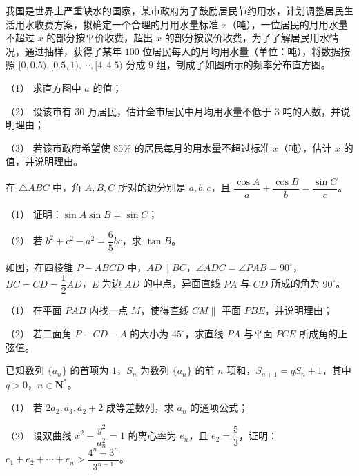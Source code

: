 \Needspace{0.4\textheight}
\begin{question}
我国是世界上严重缺水的国家，某市政府为了鼓励居民节约用水，计划调整居民生活用水收费方案，拟确定一个合理的月用水量标准 \(x\)（吨），一位居民的月用水量不超过 \(x\) 的部分按平价收费，超出 \(x\) 的部分按议价收费，为了了解居民用水情况，通过抽样，获得了某年 \(100\) 位居民每人的月均用水量（单位：吨），将数据按照 \([0,0.5),[0.5,1),\cdots,[4,4.5)\) 分成 \(9\) 组，制成了如图所示的频率分布直方图。
\nopagebreak[4]
\begin{center}\end{center}
\nopagebreak[4]
（1） 求直方图中 \(a\) 的值；

（2） 设该市有 \(30\) 万居民，估计全市居民中月均用水量不低于 \(3\) 吨的人数，并说明理由；

（3） 若该市政府希望使 85\% 的居民每月的用水量不超过标准 \(x\)（吨），估计 \(x\) 的值，并说明理由。

\end{question}
\begin{question}
在 \(\triangle ABC\) 中，角 \(A,B,C\) 所对的边分别是 \(a,b,c\)，且 \(\dfrac{\cos A}{a}+\dfrac{\cos B}{b}=\dfrac{\sin C}{c}\)。

（1） 证明：\(\sin A\sin B=\sin C\)；

（2） 若 \(b^{2}+c^{2}-a^{2}=\dfrac{6}{5}bc\)，求 \(\tan B\)。

\Needspace{0.4\textheight}
\end{question}
\begin{question}
如图，在四棱锥 \(P-ABCD\) 中，\(AD\parallel BC\)，\(\angle ADC=\angle PAB=90^{\circ}\)，\(BC=CD=\dfrac{1}{2}AD\)，\(E\) 为边 \(AD\) 的中点，异面直线 \(PA\) 与 \(CD\) 所成的角为 \(90^{\circ}\)。
\nopagebreak[4]
\begin{center}\end{center}
\nopagebreak[4]
（1） 在平面 \(PAB\) 内找一点 \(M\)，使得直线 \(CM\parallel\) 平面 \(PBE\)，并说明理由；

（2） 若二面角 \(P-CD-A\) 的大小为 \(45^{\circ}\)，求直线 \(PA\) 与平面 \(PCE\) 所成角的正弦值。

\end{question}
\begin{question}
已知数列 \(\{a_{n}\}\) 的首项为 \(1\)，\(S_{n}\) 为数列 \(\{a_{n}\}\) 的前 \(n\) 项和，\(S_{n+1}=qS_{n}+1\)，其中 \(q>0\)，\(n\in\mathbf{N}^{*}\)。

（1） 若 \(2a_{2},a_{3},a_{2}+2\) 成等差数列，求 \(a_{n}\) 的通项公式；

（2） 设双曲线 \(x^{2}-\dfrac{y^{2}}{a_{n}^{2}}=1\) 的离心率为 \(e_{n}\)，且 \(e_{2}=\dfrac{5}{3}\)，证明：\(e_{1}+e_{2}+\cdots+e_{n}>\dfrac{4^{n}-3^{n}}{3^{n-1}}\)。

\end{question}
